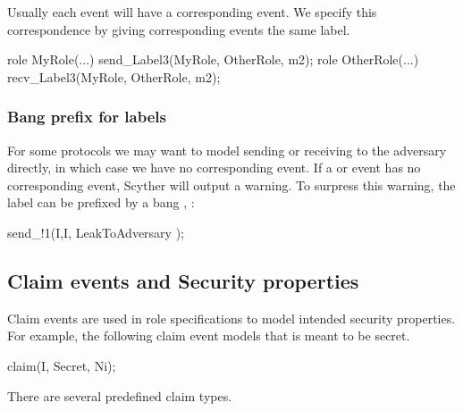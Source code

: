 \documentclass{book}
\begin{document}
Usually each  event will have a corresponding 
event. We specify this correspondence by giving corresponding events the same
label.
\begin{spdl}
  role MyRole(...) {
    send_Label3(MyRole, OtherRole, m2);
  }
  role OtherRole(...) {
    recv_Label3(MyRole, OtherRole, m2);
  }
\end{spdl}


\subsubsection*{Bang prefix for labels}

For some protocols we may want to model sending or receiving to the
adversary directly, in which case we have no corresponding event.
If a  or  event has no corresponding event, Scyther
will output a warning. To surpress this warning, the label can be
prefixed by a bang \spd{!}, \eg:
\begin{spdl}
send_!1(I,I, LeakToAdversary );
\end{spdl}


\subsection{Claim events and Security properties}

Claim events are used in role specifications to model intended security properties. For
example, the following claim event models that  is meant to be
secret.
\begin{spdl}
claim(I, Secret, Ni);
\end{spdl}

There are several predefined claim types.
\end{document}
